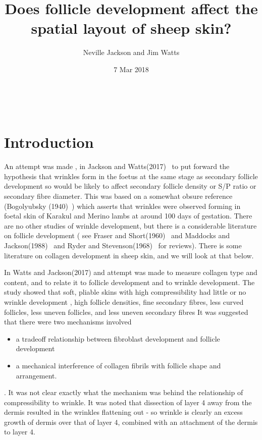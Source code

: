 \documentclass[titlepage]{article}  %
\title{Does follicle development affect the spatial layout of sheep skin?}
\author{Neville Jackson and Jim Watts}
\date{7 Mar 2018}
\begin{document}
 


 
\maketitle      
\tableofcontents

$\newcommand{\E}{\mathrm{E}}$
$\newcommand{\Var}{\mathrm{Var}}$
$\newcommand{\Cov}{\mathrm{Cov}}$ 
$\newcommand{\SD}{\mathrm{SD}}$ 

\clearpage
\section{Introduction} 
 An attempt was made , in Jackson and Watts(2017)~\cite{jack:17b} to put forward the hypothesis that wrinkles form in the foetus at the same stage as secondary follicle development so would be likely to affect secondary follicle density or S/P ratio or secondary fibre diameter. This was based on a somewhat obsure reference (Bogolyubsky (1940)~\cite{bogo:40}) which asserts that wrinkles were observed forming in foetal skin of Karakul and Merino lambs at around 100 days of gestation. There are no other studies of wrinkle development, but there is a considerable literature on follicle development ( see Fraser and Short(1960)~\cite{fras:60} and Maddocks and Jackson(1988)~\cite{madd:88} and Ryder and Stevenson(1968)~\cite{ryde:68} for reviews). There is some literature on collagen development in sheep skin, and we will look at that below.

In Watts and Jackson(2017) and attempt was made to measure collagen type and content, and to relate it to follicle development and to wrinkle development. The study showed that soft, pliable skins with high compressibility had little or no wrinkle development , high follicle densities, fine secondary fibres, less curved follicles, less uneven follicles, and less uneven secondary fibres It was suggested that there were two mechanisms involved
\begin{itemize}
\item a tradeoff relationship between fibroblast development and follicle development
\item a mechanical interference of collagen fibrils with follicle shape and arrangement.
\end{itemize}.
It was not clear exactly what the mechanism was behind the relationship of compressibility to wrinkle. It was noted that dissection of layer 4 away from the dermis resulted in the wrinkles flattening out - so wrinkle is clearly an excess growth of dermis over that of layer 4, combined with an attachment of the dermis to layer 4.
\end{document}
